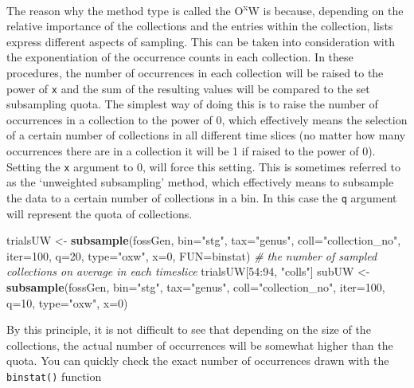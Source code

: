 \documentclass[]{article}
\newenvironment{Shaded}{\begin{snugshade}}{\end{snugshade}}
\newcommand{\KeywordTok}[1]{\textcolor[rgb]{0.13,0.29,0.53}{\textbf{{#1}}}}
\newcommand{\DataTypeTok}[1]{\textcolor[rgb]{0.13,0.29,0.53}{{#1}}}
\newcommand{\DecValTok}[1]{\textcolor[rgb]{0.00,0.00,0.81}{{#1}}}
\newcommand{\StringTok}[1]{\textcolor[rgb]{0.31,0.60,0.02}{{#1}}}
\newcommand{\CommentTok}[1]{\textcolor[rgb]{0.56,0.35,0.01}{\textit{{#1}}}}
\newcommand{\NormalTok}[1]{{#1}}
\begin{document}
The reason why the method type is called the O\textsuperscript{x}W is
because, depending on the relative importance of the collections and the
entries within the collection, lists express different aspects of
sampling. This can be taken into consideration with the exponentiation
of the occurrence counts in each collection. In these procedures, the
number of occurrences in each collection will be raised to the power of
\texttt{x} and the sum of the resulting values will be compared to the
set subsampling quota. The simplest way of doing this is to raise the
number of occurrences in a collection to the power of 0, which
effectively means the selection of a certain number of collections in
all different time slices (no matter how many occurrences there are in a
collection it will be 1 if raised to the power of 0). Setting the
\texttt{x} argument to 0, will force this setting. This is sometimes
referred to as the `unweighted subsampling' method, which effectively
means to subsample the data to a certain number of collections in a bin.
In this case the \texttt{q} argument will represent the quota of
collections.

\begin{Shaded}
\begin{Highlighting}[]
\NormalTok{trialsUW <-}\StringTok{ }\KeywordTok{subsample}\NormalTok{(fossGen, }\DataTypeTok{bin=}\StringTok{"stg"}\NormalTok{, }\DataTypeTok{tax=}\StringTok{"genus"}\NormalTok{, }\DataTypeTok{coll=}\StringTok{"collection_no"}\NormalTok{,}
  \DataTypeTok{iter=}\DecValTok{100}\NormalTok{, }\DataTypeTok{q=}\DecValTok{20}\NormalTok{, }\DataTypeTok{type=}\StringTok{"oxw"}\NormalTok{, }\DataTypeTok{x=}\DecValTok{0}\NormalTok{, }\DataTypeTok{FUN=}\NormalTok{binstat)}
\CommentTok{# the number of sampled collections on average in each timeslice}
\NormalTok{trialsUW[}\DecValTok{54}\NormalTok{:}\DecValTok{94}\NormalTok{, }\StringTok{"colls"}\NormalTok{]}
\NormalTok{subUW <-}\StringTok{ }\KeywordTok{subsample}\NormalTok{(fossGen, }\DataTypeTok{bin=}\StringTok{"stg"}\NormalTok{, }\DataTypeTok{tax=}\StringTok{"genus"}\NormalTok{, }\DataTypeTok{coll=}\StringTok{"collection_no"}\NormalTok{,}
  \DataTypeTok{iter=}\DecValTok{100}\NormalTok{, }\DataTypeTok{q=}\DecValTok{10}\NormalTok{, }\DataTypeTok{type=}\StringTok{"oxw"}\NormalTok{, }\DataTypeTok{x=}\DecValTok{0}\NormalTok{)}
\end{Highlighting}
\end{Shaded}

By this principle, it is not difficult to see that depending on the size
of the collections, the actual number of occurrences will be somewhat
higher than the quota. You can quickly check the exact number of
occurrences drawn with the \texttt{binstat()} function
\end{document}
